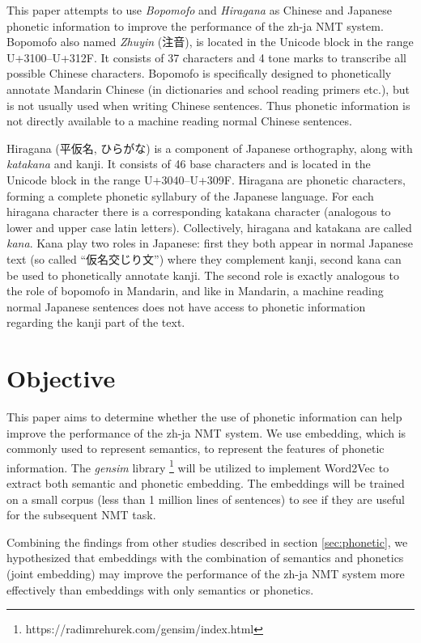 This paper attempts to use \textit{Bopomofo} and \textit{Hiragana} as Chinese and Japanese phonetic information to improve the performance of the zh-ja NMT system. Bopomofo also named \textit{Zhuyin} (注音), is located in the Unicode block in the range U+3100–U+312F. It consists of 37 characters and 4 tone marks to transcribe all possible Chinese characters. Bopomofo is specifically designed to phonetically annotate Mandarin Chinese (in dictionaries and school reading primers etc.), but is not usually used when writing Chinese sentences. Thus phonetic information is not directly available to a machine reading normal Chinese sentences.
\begin{CJK}{UTF8}{ipxm}
Hiragana (平仮名, ひらがな) is a component of Japanese orthography, along with \textit{katakana} and kanji. It consists of 46 base characters and is located in the Unicode block in the range U+3040–U+309F. Hiragana are phonetic characters, forming a complete phonetic syllabury of the Japanese language. For each hiragana character there is a corresponding katakana character (analogous to lower and upper case latin letters). Collectively, hiragana and katakana are called \textit{kana}. Kana play two roles in Japanese: first they both appear in normal Japanese text (so called ``仮名交じり文'') where they complement kanji, second kana can be used to phonetically annotate kanji. The second role is exactly analogous to the role of bopomofo in Mandarin, and like in Mandarin, a machine reading normal Japanese sentences does not have access to phonetic information regarding the kanji part of the text.
\end{CJK}


\section{Objective} \label{sec:objective}

This paper aims to determine whether the use of phonetic information can help improve the performance of the zh-ja NMT system. We use embedding, which is commonly used to represent semantics, to represent the features of phonetic information. The \textit{gensim} library \footnote{https://radimrehurek.com/gensim/index.html} will be utilized to implement Word2Vec \cite{mikolov2013efficient} to extract both semantic and phonetic embedding. The embeddings will be trained on a small corpus (less than 1 million lines of sentences) to see if they are useful for the subsequent NMT task.

Combining the findings from other studies \cite{liu-etal-2019-robust, khan2019diversity} described in section \ref{sec:phonetic}, we hypothesized that embeddings with the combination of semantics and phonetics (joint embedding) may improve the performance of the zh-ja NMT system more effectively than embeddings with only semantics or phonetics. 

